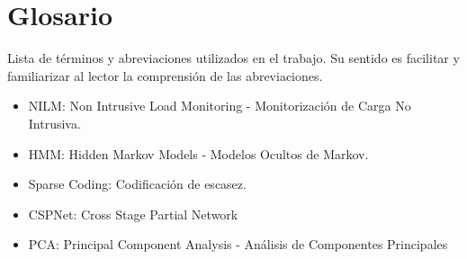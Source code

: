 \chapter{Glosario}
\label{ch:anexoa}
Lista de términos y abreviaciones utilizados en el trabajo. Su sentido es facilitar y familiarizar al lector la comprensión de las abreviaciones.
\begin{itemize}
    \item NILM: Non Intrusive Load Monitoring - Monitorización de Carga No Intrusiva.
    \item HMM: Hidden Markov Models - Modelos Ocultos de Markov.
    \item Sparse Coding: Codificación de escasez.
    \item CSPNet: Cross Stage Partial Network
    \item PCA: Principal Component Analysis - Análisis de Componentes Principales
\end{itemize}